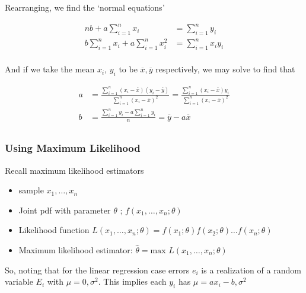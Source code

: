 \documentclass[10pt]{article}
\begin{document}
Rearranging, we find the `normal equations'

\begin{equation}
	\begin{split}
		nb + a\sum^n_{i=1} x_i &= \sum^n_{i=1} y_i  \\
		b\sum^n_{i=1} x_i + a\sum^n_{i=1} x_i^2  &=\sum^n_{i=1} x_i y_i   \\
	\end{split}
\end{equation}

And if we take the mean $ x_i $, $ y_i $ to be $ \overline{x}, \overline{y} $ respectively, we may solve to find that

\begin{equation}
	\begin{split}
		a &= \frac{\sum^n_{i=1} (x_i - \overline{x})(y_i - \overline{y})}{\sum^n_{i=1} (x_i - \overline{x})^2} = \frac{\sum^n_{i=1} (x_i - \overline{x})y_i }{\sum^n_{i=1}(x_i - \overline{x})^2}  \\
		b &=  \frac{\sum^n_{i=1} y_i - a\sum^n_{i=1} y_i }{n} = \overline{y} - a \overline{x} \\
	\end{split}
\end{equation}


\subsubsection{Using Maximum Likelihood}
Recall maximum likelihood estimators


\begin{itemize}
	\item sample $  x_1, \ldots, x_n $ 
	\item Joint pdf with parameter $ \theta $ ; $ f(x_1, \ldots, x_n; \theta) $ 
	\item Likelihood function $ L(x_1, \ldots, x_n; \theta) = f(x_1; \theta) f(x_2; \theta)\ldots f(x_n; \theta) $ 
	\item Maximum likelihood estimator: $ \hat{\theta} = \text{max } L(x_1, \ldots, x_n; \theta) $
\end{itemize}

So, noting that for the linear regression case errors $ e_i $ is a realization of a random variable $ E_i $ with $ \mu = 0, \sigma^2 $. This implies each $ y_i $ has $ \mu = ax_i - b, \sigma^2 $ 
\end{document}
